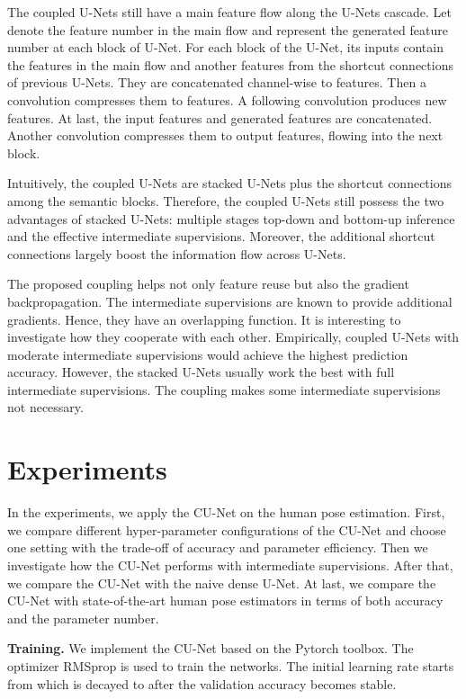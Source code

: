 \documentclass{bmvc2k}
\begin{document}
The coupled U-Nets still have a main feature flow along the U-Nets cascade. Let  denote the feature number in the main flow and  represent the generated feature number at each block of U-Net. For each block of the  U-Net, its inputs contain the  features in the main flow and another  features from the shortcut connections of previous U-Nets. They are concatenated channel-wise to  features. Then a  convolution compresses them to  features. A following  convolution produces  new features. At last, the  input features and  generated features are concatenated. Another  convolution compresses them to  output features, flowing into the next block.

Intuitively, the coupled U-Nets are stacked U-Nets plus the shortcut connections among the semantic blocks. Therefore, the coupled U-Nets still possess the two advantages of stacked U-Nets: multiple stages top-down and bottom-up inference and the effective intermediate supervisions. Moreover, the additional shortcut connections largely boost the information flow across U-Nets.

The proposed coupling helps not only feature reuse but also the gradient backpropagation. The intermediate supervisions are known to provide additional gradients. Hence, they have an overlapping function. It is interesting to investigate how they cooperate with each other. Empirically, coupled U-Nets with moderate intermediate supervisions would achieve the highest prediction accuracy. However, the stacked U-Nets usually work the best with full intermediate supervisions. The coupling makes some intermediate supervisions not necessary.







 \section{Experiments}
In the experiments, we apply the CU-Net on the human pose estimation. First, we compare different hyper-parameter configurations of the CU-Net and choose one setting with the trade-off of accuracy and parameter efficiency. Then we investigate how the CU-Net performs with intermediate supervisions. After that, we compare the CU-Net with the naive dense U-Net. At last, we compare the CU-Net with state-of-the-art human pose estimators in terms of both accuracy and the parameter number.

{\bf Training.} We implement the CU-Net based on the Pytorch toolbox. The optimizer RMSprop is used to train the networks. The initial learning rate starts from  which is decayed to  after the validation accuracy becomes stable.
\end{document}
